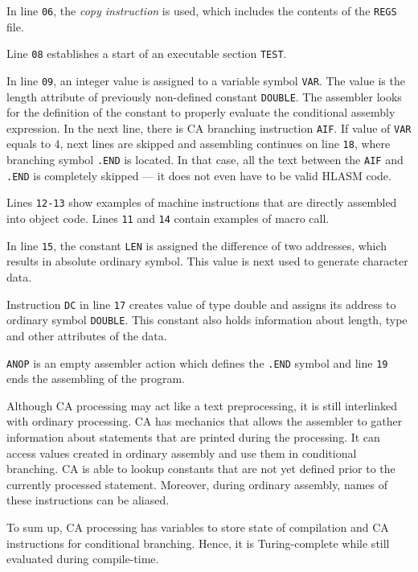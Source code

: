 In line \verb|06|, the \emph{copy instruction} is used, which includes the contents of the \verb|REGS| file.

Line \verb|08| establishes a start of an executable section \verb|TEST|. 

In line \verb|09|, an integer value is assigned to a variable symbol \verb|VAR|. The value is the length attribute of previously non-defined constant \verb|DOUBLE|. The assembler looks for the definition of the constant to properly evaluate the conditional assembly expression. In the next line, there is CA branching instruction \verb|AIF|. If value of \verb|VAR| equals to 4, next lines are skipped and assembling continues on line \verb|18|, where branching symbol \verb|.END| is located. In that case, all the text between the \verb|AIF| and \verb|.END| is completely skipped --- it does not even have to be valid HLASM code.

Lines \verb|12-13| show examples of machine instructions that are directly assembled into object code. Lines \verb|11| and \verb|14| contain examples of macro call.

In line \verb|15|, the constant \verb|LEN| is assigned the difference of two addresses, which results in absolute ordinary symbol. This value is next used to generate character data.

Instruction \verb|DC| in line \verb|17| creates value of type double and assigns its address to ordinary symbol \verb|DOUBLE|. This constant also holds information about length, type and other attributes of the data.  

\verb|ANOP| is an empty assembler action which defines the \verb|.END| symbol and line \verb|19| ends the assembling of the program. 

\vspace{5mm}

Although CA processing may act like a text preprocessing, it is still interlinked with ordinary processing. CA has mechanics that allows the assembler to gather information about statements that are printed during the processing. It can access values created in ordinary assembly and use them in conditional branching. CA is able to lookup constants that are not yet defined prior to the currently processed statement. Moreover, during ordinary assembly, names of these instructions can be aliased.

To sum up, CA processing has variables to store state of compilation and CA instructions for conditional branching. Hence, it is Turing-complete while still evaluated during compile-time.

